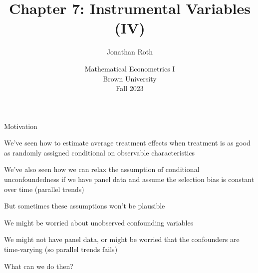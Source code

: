 \documentclass[11pt,english,handout]{beamer}
\newenvironment{wideitemize}{\itemize\addtolength{\itemsep}{10pt}}{\enditemize}
\begin{document}
	
	\begin{frame}[noframenumbering]{}
		\vspace{0.5cm}
		\title[]{Chapter 7: Instrumental Variables (IV)}
		\author{Jonathan Roth}
		\date{Mathematical Econometrics I \\ Brown University\\Fall 2023} 
		\titlepage {\small{}\ }\thispagestyle{empty} \vspace{-30pt}
		
	\end{frame}
	
	
	\begin{frame}{Motivation}
		
		\begin{wideitemize}
			\item
			We've seen how to estimate average treatment effects when treatment is as good as randomly assigned conditional on observable characteristics
			
			\item
			We've also seen how we can relax the assumption of conditional unconfoundedness if we have panel data and assume the selection bias is constant over time (parallel trends)
			
			
			\pause
			
			\item
			But sometimes these assumptions won't be plausible
			
			\pause
				\begin{itemize}
					{\normalsize					
					\item
					We might be worried about unobserved confounding variables
					
					\item
					We might not have panel data, or might be worried that the confounders are time-varying (so parallel trends fails)
					} 
				\end{itemize}			
			
			
			\pause
			
			\item
			What can we do then? 
		\end{wideitemize}
		
	\end{frame}
	
\end{document}
